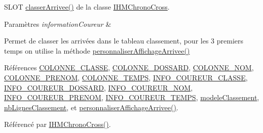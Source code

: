 S\+L\+OT \hyperlink{class_i_h_m_chrono_cross_a5e9b561659ba63d2739335b8ab432cbf}{classer\+Arrivee()} de la classe \hyperlink{class_i_h_m_chrono_cross}{I\+H\+M\+Chrono\+Cross}. 


\begin{DoxyParams}{Paramètres}
{\em information\+Coureur} & \\
\hline
\end{DoxyParams}
Permet de classer les arrivées dans le tableau classement, pour les 3 premiers temps on utilise la méthode \hyperlink{class_i_h_m_chrono_cross_a41c2ff49d25069f8dfa2a7b3d0606d38}{personnaliser\+Affichage\+Arrivee()} 

Références \hyperlink{ihmchronocross_8h_a114680edc01528f77bb689b0a2ca18a2}{C\+O\+L\+O\+N\+N\+E\+\_\+\+C\+L\+A\+S\+SE}, \hyperlink{ihmchronocross_8h_a9b0cee5420830f3ca3f8561b4c1e64db}{C\+O\+L\+O\+N\+N\+E\+\_\+\+D\+O\+S\+S\+A\+RD}, \hyperlink{ihmchronocross_8h_aeee76385895c145ef5a633e6c6812603}{C\+O\+L\+O\+N\+N\+E\+\_\+\+N\+OM}, \hyperlink{ihmchronocross_8h_a5d6f240d26209cd66db8aa5e1aac62f9}{C\+O\+L\+O\+N\+N\+E\+\_\+\+P\+R\+E\+N\+OM}, \hyperlink{ihmchronocross_8h_add3424f8ad3c4224de29631acdf57899}{C\+O\+L\+O\+N\+N\+E\+\_\+\+T\+E\+M\+PS}, \hyperlink{ihmchronocross_8h_a104dfa4cfc656a690caaec36fd4d3e2d}{I\+N\+F\+O\+\_\+\+C\+O\+U\+R\+E\+U\+R\+\_\+\+C\+L\+A\+S\+SE}, \hyperlink{ihmchronocross_8h_a11e2b6314d0646876d7a9ef2b583a521}{I\+N\+F\+O\+\_\+\+C\+O\+U\+R\+E\+U\+R\+\_\+\+D\+O\+S\+S\+A\+RD}, \hyperlink{ihmchronocross_8h_a71b99ea06ae916bcd158edbd441c8c24}{I\+N\+F\+O\+\_\+\+C\+O\+U\+R\+E\+U\+R\+\_\+\+N\+OM}, \hyperlink{ihmchronocross_8h_a68fd2611ad0ef66da1a71726675067e7}{I\+N\+F\+O\+\_\+\+C\+O\+U\+R\+E\+U\+R\+\_\+\+P\+R\+E\+N\+OM}, \hyperlink{ihmchronocross_8h_a156e68578bd6e6dfe628622b22b256af}{I\+N\+F\+O\+\_\+\+C\+O\+U\+R\+E\+U\+R\+\_\+\+T\+E\+M\+PS}, \hyperlink{class_i_h_m_chrono_cross_ac25c95280801f36c43a1c41cf2fa253e}{modele\+Classement}, \hyperlink{class_i_h_m_chrono_cross_a86ed3469ca99988211bcf0970527c119}{nb\+Lignes\+Classement}, et \hyperlink{class_i_h_m_chrono_cross_a41c2ff49d25069f8dfa2a7b3d0606d38}{personnaliser\+Affichage\+Arrivee()}.



Référencé par \hyperlink{class_i_h_m_chrono_cross_a479fc90733fba3e65fb06aa4a3adc02e}{I\+H\+M\+Chrono\+Cross()}.


